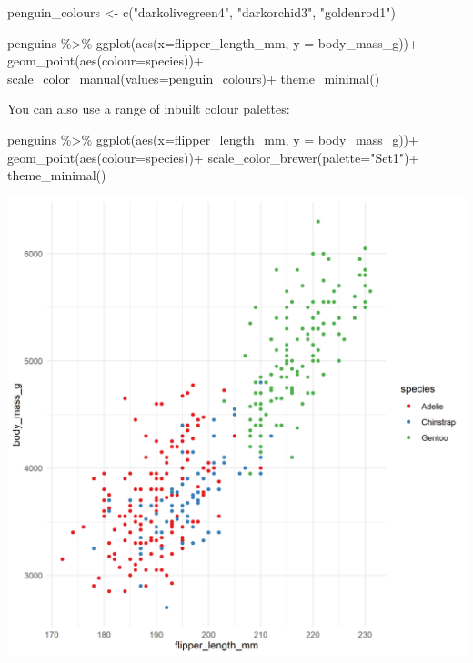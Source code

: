 \documentclass[
]{book}
\newenvironment{Shaded}{\begin{snugshade}}{\end{snugshade}}
\newcommand{\AttributeTok}[1]{\textcolor[rgb]{0.77,0.63,0.00}{#1}}
\newcommand{\FunctionTok}[1]{\textcolor[rgb]{0.00,0.00,0.00}{#1}}
\newcommand{\NormalTok}[1]{#1}
\newcommand{\OtherTok}[1]{\textcolor[rgb]{0.56,0.35,0.01}{#1}}
\newcommand{\SpecialCharTok}[1]{\textcolor[rgb]{0.00,0.00,0.00}{#1}}
\newcommand{\StringTok}[1]{\textcolor[rgb]{0.31,0.60,0.02}{#1}}
\begin{document}
\begin{Shaded}
\begin{Highlighting}[]
\NormalTok{penguin\_colours }\OtherTok{\textless{}{-}} \FunctionTok{c}\NormalTok{(}\StringTok{"darkolivegreen4"}\NormalTok{, }\StringTok{"darkorchid3"}\NormalTok{, }\StringTok{"goldenrod1"}\NormalTok{)}

\NormalTok{penguins }\SpecialCharTok{\%\textgreater{}\%} 
  \FunctionTok{ggplot}\NormalTok{(}\FunctionTok{aes}\NormalTok{(}\AttributeTok{x=}\NormalTok{flipper\_length\_mm, }
             \AttributeTok{y =}\NormalTok{ body\_mass\_g))}\SpecialCharTok{+}
  \FunctionTok{geom\_point}\NormalTok{(}\FunctionTok{aes}\NormalTok{(}\AttributeTok{colour=}\NormalTok{species))}\SpecialCharTok{+}
  \FunctionTok{scale\_color\_manual}\NormalTok{(}\AttributeTok{values=}\NormalTok{penguin\_colours)}\SpecialCharTok{+}
  \FunctionTok{theme\_minimal}\NormalTok{()}
\end{Highlighting}
\end{Shaded}

You can also use a range of inbuilt colour palettes:

\begin{Shaded}
\begin{Highlighting}[]
\NormalTok{penguins }\SpecialCharTok{\%\textgreater{}\%} 
  \FunctionTok{ggplot}\NormalTok{(}\FunctionTok{aes}\NormalTok{(}\AttributeTok{x=}\NormalTok{flipper\_length\_mm, }
             \AttributeTok{y =}\NormalTok{ body\_mass\_g))}\SpecialCharTok{+}
  \FunctionTok{geom\_point}\NormalTok{(}\FunctionTok{aes}\NormalTok{(}\AttributeTok{colour=}\NormalTok{species))}\SpecialCharTok{+}
  \FunctionTok{scale\_color\_brewer}\NormalTok{(}\AttributeTok{palette=}\StringTok{"Set1"}\NormalTok{)}\SpecialCharTok{+}
  \FunctionTok{theme\_minimal}\NormalTok{()}
\end{Highlighting}
\end{Shaded}

\includegraphics[width=0.8\linewidth]{images/penguinspalette}
\end{document}
